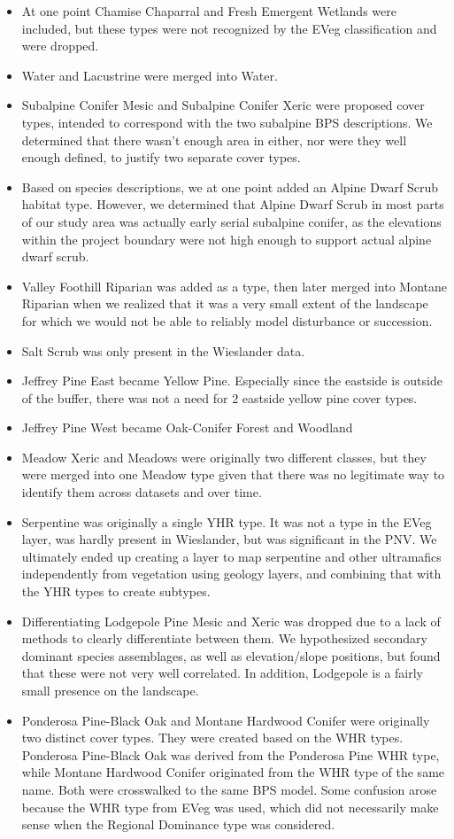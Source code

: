 \begin{itemize}
\item At one point Chamise Chaparral and Fresh Emergent Wetlands were included, but these types were not recognized by the EVeg classification and were dropped.
\item Water and Lacustrine were merged into Water.
\item Subalpine Conifer Mesic and Subalpine Conifer Xeric were proposed cover types, intended to correspond with the two subalpine BPS descriptions. We determined that there wasn't enough area in either, nor were they well enough defined, to justify two separate cover types.
\item Based on species descriptions, we at one point added an Alpine Dwarf Scrub habitat type. However, we determined that Alpine Dwarf Scrub in most parts of our study area was actually early serial subalpine conifer, as the elevations within the project boundary were not high enough to support actual alpine dwarf scrub.
\item Valley Foothill Riparian was added as a type, then later merged into Montane Riparian when we realized that it was a very small extent of the landscape for which we would not be able to reliably model disturbance or succession.
\item Salt Scrub was only present in the Wieslander data.
\item Jeffrey Pine East became Yellow Pine. Especially since the eastside is outside of the buffer, there was not a need for 2 eastside yellow pine cover types.
\item Jeffrey Pine West became Oak-Conifer Forest and Woodland
\item Meadow Xeric and Meadows were originally two different classes, but they were merged into one Meadow type given that there was no legitimate way to identify them across datasets and over time.
\item Serpentine was originally a single YHR type. It was not a type in the EVeg layer, was hardly present in Wieslander, but was significant in the PNV. We ultimately ended up creating a layer to map serpentine and other ultramafics independently from vegetation using geology layers, and combining that with the YHR types to create subtypes.
\item Differentiating Lodgepole Pine Mesic and Xeric was dropped due to a lack of methods to clearly differentiate between them. We hypothesized secondary dominant species assemblages, as well as elevation/slope positions, but found that these were not very well correlated. In addition, Lodgepole is a fairly small presence on the landscape.
\item Ponderosa Pine-Black Oak and Montane Hardwood Conifer were originally two distinct cover types. They were created based on the WHR types. Ponderosa Pine-Black Oak was derived from the Ponderosa Pine WHR type, while Montane Hardwood Conifer originated from the WHR type of the same name. Both were crosswalked to the same BPS model. Some confusion arose because the WHR type from EVeg was used, which did not necessarily make sense when the Regional Dominance type was considered. 


\end{itemize}
